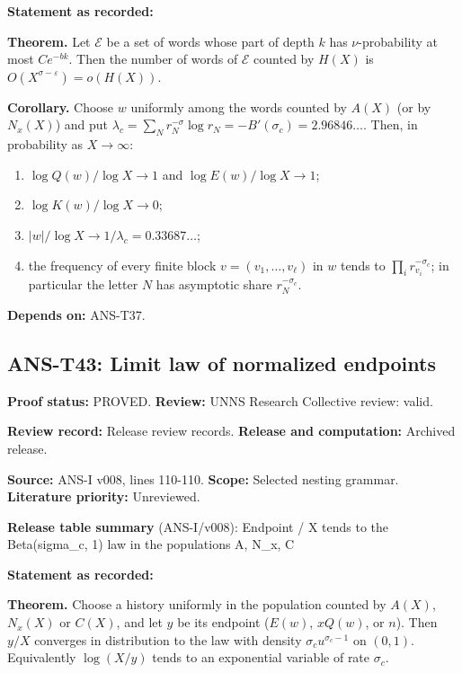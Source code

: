 \documentclass[
  11pt,
]{article}
\providecommand{\tightlist}{%
  \setlength{\itemsep}{0pt}\setlength{\parskip}{0pt}}
\begin{document}
\textbf{Statement as recorded:}

\textbf{Theorem.} Let \(\mathcal E\) be a set of words whose part of
depth \(k\) has \(\nu\)-probability at most \(Ce^{-bk}\). Then the
number of words of \(\mathcal E\) counted by \(H(X)\) is
\(O(X^{\sigma-\varepsilon})=o(H(X))\).

\textbf{Corollary.} Choose \(w\) uniformly among the words counted by
\(A(X)\) (or by \(N_x(X)\)) and put
\(\lambda_c=\sum_Nr_N^{-\sigma}\log r_N=-B'(\sigma_c)=2.96846\ldots\).
Then, in probability as \(X\to\infty\):

\begin{enumerate}
\def\labelenumi{\arabic{enumi}.}
\tightlist
\item
  \(\log Q(w)/\log X\to1\) and \(\log E(w)/\log X\to1\);
\item
  \(\log K(w)/\log X\to0\);
\item
  \(|w|/\log X\to1/\lambda_c=0.33687\ldots\);
\item
  the frequency of every finite block \(v=(v_1,\dots,v_\ell)\) in \(w\)
  tends to \(\prod_ir_{v_i}^{-\sigma_c}\); in particular the letter
  \(N\) has asymptotic share \(r_N^{-\sigma_c}\).
\end{enumerate}

\textbf{Depends on:} ANS-T37.

\hypertarget{ans-t43-limit-law-of-normalized-endpoints}{%
\subsection{ANS-T43: Limit law of normalized
endpoints}\label{ans-t43-limit-law-of-normalized-endpoints}}

\textbf{Proof status:} PROVED. \textbf{Review:} UNNS Research Collective
review: valid.

\textbf{Review record:} Release review records. \textbf{Release and
computation:} Archived release.

\textbf{Source:} ANS-I v008, lines 110-110. \textbf{Scope:} Selected
nesting grammar. \textbf{Literature priority:} Unreviewed.

\textbf{Release table summary} (ANS-I/v008): Endpoint / X tends to the
Beta(sigma\_c, 1) law in the populations A, N\_x, C

\textbf{Statement as recorded:}

\textbf{Theorem.} Choose a history uniformly in the population counted
by \(A(X)\), \(N_x(X)\) or \(C(X)\), and let \(y\) be its endpoint
(\(E(w)\), \(xQ(w)\), or \(n\)). Then \(y/X\) converges in distribution
to the law with density \(\sigma_cu^{\sigma_c-1}\) on \((0,1)\).
Equivalently \(\log(X/y)\) tends to an exponential variable of rate
\(\sigma_c\).
\end{document}
